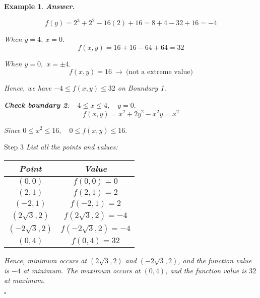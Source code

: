 \documentclass[12pt,a4paper]{article}
\newtheorem{eg}{Example}[subsection]
\newenvironment*{ans}{\par\indent\textbf{\textit{Answer. }}\par}{\par\hfill{$\square$}\par}
\begin{document}
\begin{eg}
\begin{ans}
\[f(y)=2^3+2^2-16(2)+16=8+4-32+16=-4\]\par\hspace{10mm} When $y=4$, $x=0.$\[f(x,y)=16+16-64+64=32\]\par\hspace{10mm} When $y=0,$ $x=\pm4.$ \[f(x,y)=16\ \rightarrow\ \text{(not a extreme value)}\]\par\hspace{10mm} Hence, we have $-4\leq f(x,y)\leq32$ on Boundary 1. \par\hspace{5mm}\textbf{Check boundary 2}: $-4\leq x\leq 4,\quad y=0.$ \[f(x,y)=x^2+2y^2-x^2y=x^2\]\par\hspace{10mm} Since $0\leq x^2\leq 16,\quad0\leq f(x,y)\leq16.$\par$\boxed{\text{Step }3}$ List all the points and values: \begin{center}\begin{tabular}{c|c}Point&Value\\\hline$(0,0)$&$f(0,0)=0$\\$(2,1)$&$f(2,1)=2$\\$(-2,1)$&$f(-2,1)=2$\\$(2\sqrt{3},2)$&$f(2\sqrt{3},2)=-4$\\$(-2\sqrt{3},2)$&$f(-2\sqrt{3},2)=-4$\\$(0,4)$&$f(0,4)=32$\\\end{tabular}\end{center}\par\hspace{10mm} Hence, minimum occurs at $(2\sqrt{3}, 2)$ and $(-2\sqrt{3},2)$, and the function value is $-4$ at minimum. The maximum occurs at $(0,4)$, and the function value is $32$ at maximum. 
	\end{ans}
\end{eg}
\end{document}

